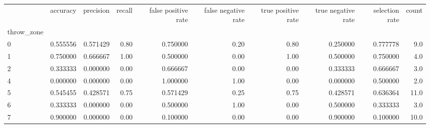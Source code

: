 \begin{tabular}{lrrrrrrrrr}
\toprule
{} &  accuracy &  precision &  recall &  false positive rate &  false negative rate &  true positive rate &  true negative rate &  selection rate &  count \\
throw\_zone &           &            &         &                      &                      &                     &                     &                 &        \\
\midrule
0          &  0.555556 &   0.571429 &    0.80 &             0.750000 &                 0.20 &                0.80 &            0.250000 &        0.777778 &    9.0 \\
1          &  0.750000 &   0.666667 &    1.00 &             0.500000 &                 0.00 &                1.00 &            0.500000 &        0.750000 &    4.0 \\
2          &  0.333333 &   0.000000 &    0.00 &             0.666667 &                 0.00 &                0.00 &            0.333333 &        0.666667 &    3.0 \\
4          &  0.000000 &   0.000000 &    0.00 &             1.000000 &                 1.00 &                0.00 &            0.000000 &        0.500000 &    2.0 \\
5          &  0.545455 &   0.428571 &    0.75 &             0.571429 &                 0.25 &                0.75 &            0.428571 &        0.636364 &   11.0 \\
6          &  0.333333 &   0.000000 &    0.00 &             0.500000 &                 1.00 &                0.00 &            0.500000 &        0.333333 &    3.0 \\
7          &  0.900000 &   0.000000 &    0.00 &             0.100000 &                 0.00 &                0.00 &            0.900000 &        0.100000 &   10.0 \\
\bottomrule
\end{tabular}
